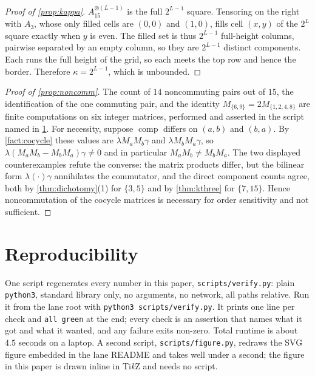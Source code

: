 \documentclass[11pt]{amsart}
\theoremstyle{definition}
\theoremstyle{remark}
\begin{document}
\begin{proof}[Proof of \cref{prop:kappa}]
$A_{15}^{\otimes(L-1)}$ is the full $2^{L-1}$ square. Tensoring on the right with $A_3$, whose only filled cells are $(0,0)$ and $(1,0)$, fills cell $(x,y)$ of the $2^L$ square exactly when $y$ is even. The filled set is thus $2^{L-1}$ full-height columns, pairwise separated by an empty column, so they are $2^{L-1}$ distinct components. Each runs the full height of the grid, so each meets the top row and hence the border. Therefore $\kappa = 2^{L-1}$, which is unbounded.
\end{proof}

\begin{proof}[Proof of \cref{prop:noncomm}]
The count of $14$ noncommuting pairs out of $15$, the identification of the one commuting pair, and the identity $M_{\{6,9\}} = 2 M_{\{1,2,4,8\}}$ are finite computations on six integer matrices, performed and asserted in the script named in \cref{sec:repro}. For necessity, suppose $\operatorname{comp}$ differs on $(a,b)$ and $(b,a)$. By \cref{fact:cocycle} these values are $\lambda M_a M_b \gamma$ and $\lambda M_b M_a \gamma$, so $\lambda(M_aM_b - M_bM_a)\gamma \neq 0$ and in particular $M_aM_b \neq M_bM_a$. The two displayed counterexamples refute the converse: the matrix products differ, but the bilinear form $\lambda(\cdot)\gamma$ annihilates the commutator, and the direct component counts agree, both by \cref{thm:dichotomy}(1) for $\{3,5\}$ and by \cref{thm:kthree} for $\{7,15\}$. Hence noncommutation of the cocycle matrices is necessary for order sensitivity and not sufficient.
\end{proof}

\section{Reproducibility}
\label{sec:repro}

One script regenerates every number in this paper, \texttt{scripts/verify.py}: plain \texttt{python3}, standard library only, no arguments, no network, all paths relative. Run it from the lane root with \texttt{python3 scripts/verify.py}. It prints one line per check and \texttt{all green} at the end; every check is an assertion that names what it got and what it wanted, and any failure exits non-zero. Total runtime is about $4.5$ seconds on a laptop. A second script, \texttt{scripts/figure.py}, redraws the SVG figure embedded in the lane README and takes well under a second; the figure in this paper is drawn inline in Ti\emph{k}Z and needs no script.
\end{document}
